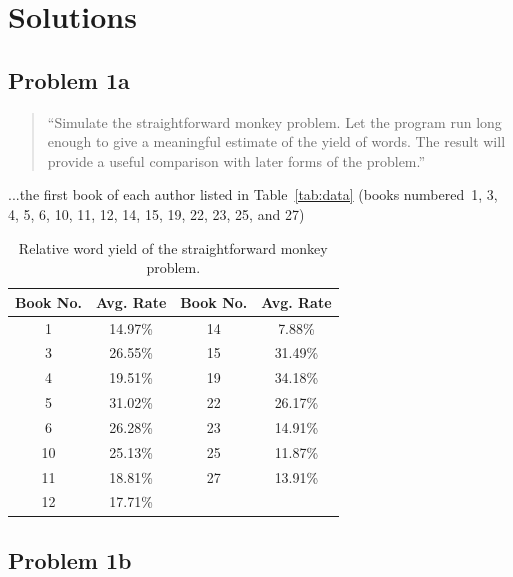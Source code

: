 \documentclass[conference]{IEEEtran}
\newcommand{\codefile}[1]{
  \begin{framed}
  \fontsize{5.65}{6.78}\selectfont
  
  \end{framed}
}
\begin{document}
\section{Solutions\label{sec:solutions}}



\subsection{Problem 1a}

\begin{quote}
``Simulate the straightforward monkey problem. Let the program run long enough to 
give a meaningful estimate of the yield of words. The result will provide a 
useful comparison with later forms of the problem.''
\end{quote}

...the first book of each author listed in Table~\ref{tab:data} (books numbered~1, 
3, 4, 5, 6, 10, 11, 12, 14, 15, 19, 22, 23, 25, and 27)

\codefile{problem1a.py}

\begin{table}
\caption{Relative word yield of the straightforward monkey problem.\label{tab:problem1a}}
\vspace{-10pt}
\begin{center}
\begin{tabular}{cccc}
\hline
Book No. & Avg. Rate & Book No. & Avg. Rate \\
\hline
1  & 14.97\% & 14 & 7.88\% \\
3  & 26.55\% & 15 & 31.49\% \\
4  & 19.51\% & 19 & 34.18\% \\
5  & 31.02\% & 22 & 26.17\% \\
6  & 26.28\% & 23 & 14.91\% \\
10 & 25.13\% & 25 & 11.87\% \\
11 & 18.81\% & 27 & 13.91\% \\
12 & 17.71\% & & \\
\hline
\end{tabular}
\end{center}
\end{table}


\subsection{Problem 1b}
\end{document}
